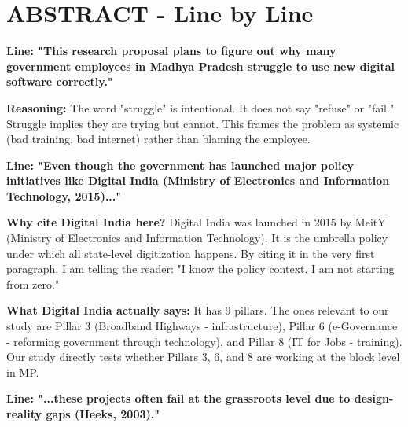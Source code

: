 \documentclass[11pt,a4paper]{article}
\begin{document}
\section{ABSTRACT - Line by Line}

\textbf{Line: "This research proposal plans to figure out why many government employees in Madhya Pradesh struggle to use new digital software correctly."}

\begin{abox}
\textbf{Reasoning:} The word "struggle" is intentional. It does not say "refuse" or "fail." Struggle implies they are trying but cannot. This frames the problem as systemic (bad training, bad internet) rather than blaming the employee.
\end{abox}

\textbf{Line: "Even though the government has launched major policy initiatives like Digital India (Ministry of Electronics and Information Technology, 2015)..."}

\begin{abox}
\textbf{Why cite Digital India here?} Digital India was launched in 2015 by MeitY (Ministry of Electronics and Information Technology). It is the umbrella policy under which all state-level digitization happens. By citing it in the very first paragraph, I am telling the reader: "I know the policy context. I am not starting from zero."

\textbf{What Digital India actually says:} It has 9 pillars. The ones relevant to our study are Pillar 3 (Broadband Highways - infrastructure), Pillar 6 (e-Governance - reforming government through technology), and Pillar 8 (IT for Jobs - training). Our study directly tests whether Pillars 3, 6, and 8 are working at the block level in MP.
\end{abox}

\textbf{Line: "...these projects often fail at the grassroots level due to design-reality gaps (Heeks, 2003)."}
\end{document}
